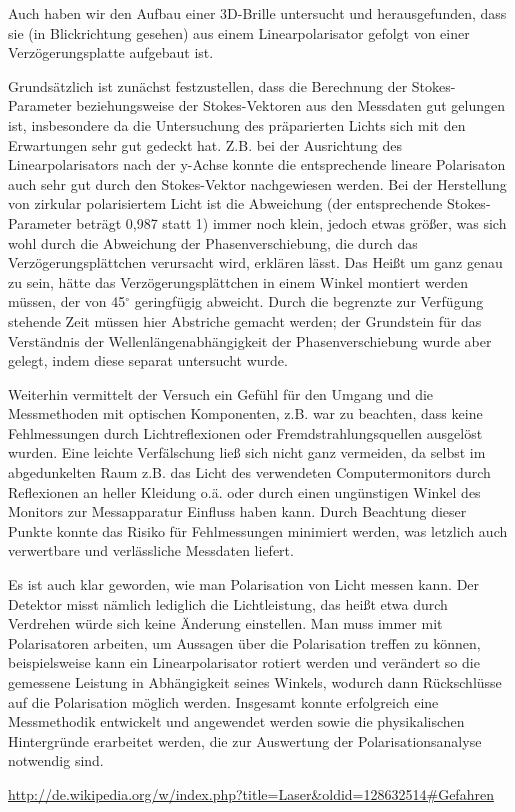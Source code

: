 \documentclass[bigchapter,colorback,accentcolor=tud4b,linedtoc,11pt]{tudreport}
\begin{document}
Auch haben wir den Aufbau einer 3D-Brille untersucht und herausgefunden, dass sie (in Blickrichtung gesehen) aus einem Linearpolarisator gefolgt von einer Verzögerungsplatte aufgebaut ist.

Grundsätzlich ist zunächst festzustellen, dass die Berechnung der Stokes-Parameter beziehungsweise der Stokes-Vektoren aus den Messdaten gut gelungen ist, insbesondere da die Untersuchung des präparierten Lichts sich mit den Erwartungen sehr gut gedeckt hat. Z.B. bei der Ausrichtung des Linearpolarisators nach der y-Achse konnte die entsprechende lineare Polarisaton auch sehr gut durch den Stokes-Vektor nachgewiesen werden. Bei der Herstellung von zirkular polarisiertem Licht ist die Abweichung (der entsprechende Stokes-Parameter beträgt 0,987 statt 1) immer noch klein, jedoch etwas größer, was sich wohl durch die Abweichung der Phasenverschiebung, die durch das Verzögerungsplättchen verursacht wird, erklären lässt. Das Heißt um ganz genau zu sein, hätte das Verzögerungsplättchen in einem Winkel montiert werden müssen, der von 45$^{\circ}$ geringfügig abweicht. Durch die begrenzte zur Verfügung stehende Zeit müssen hier Abstriche gemacht werden; der Grundstein für das Verständnis der Wellenlängenabhängigkeit der Phasenverschiebung wurde aber gelegt, indem diese separat untersucht wurde. 

Weiterhin vermittelt der Versuch ein Gefühl für den Umgang und die Messmethoden mit optischen Komponenten, z.B. war zu beachten, dass keine Fehlmessungen durch Lichtreflexionen oder Fremdstrahlungsquellen ausgelöst wurden. Eine leichte Verfälschung ließ sich nicht ganz vermeiden, da selbst im abgedunkelten Raum z.B. das Licht des verwendeten Computermonitors durch Reflexionen an heller Kleidung o.ä. oder durch einen ungünstigen Winkel des Monitors zur Messapparatur Einfluss haben kann. Durch Beachtung dieser Punkte konnte das Risiko für Fehlmessungen minimiert werden, was letzlich auch verwertbare und verlässliche Messdaten liefert.

Es ist auch klar geworden, wie man Polarisation von Licht messen kann. Der Detektor misst nämlich lediglich die Lichtleistung, das heißt etwa durch Verdrehen würde sich keine Änderung einstellen. Man muss immer mit Polarisatoren arbeiten, um Aussagen über die Polarisation treffen zu können, beispielsweise kann ein Linearpolarisator rotiert werden und verändert so die gemessene Leistung in Abhängigkeit seines Winkels, wodurch dann Rückschlüsse auf die Polarisation möglich werden. Insgesamt konnte erfolgreich eine Messmethodik entwickelt und angewendet werden sowie die physikalischen Hintergründe erarbeitet werden, die zur Auswertung der Polarisationsanalyse notwendig sind.
\cleardoublepage{}
\newpage
\begin{thebibliography}{100}
   \url{http://de.wikipedia.org/w/index.php?title=Laser&oldid=128632514#Gefahren}
\end{thebibliography}

\cleardoublepage{}
\end{document}
